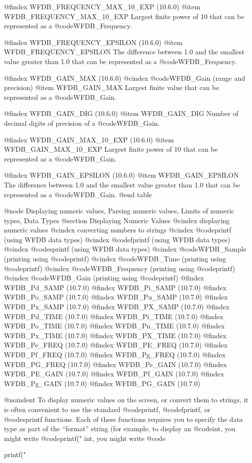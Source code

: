 {{{{{{{{{@findex WFDB_FREQUENCY_MAX_10_EXP (10.6.0)
@item WFDB_FREQUENCY_MAX_10_EXP
Largest finite power of 10 that can be represented as a @code{WFDB_Frequency}.

@findex WFDB_FREQUENCY_EPSILON (10.6.0)
@item WFDB_FREQUENCY_EPSILON
The difference between 1.0 and the smallest value greater than 1.0 that can be
represented as a @code{WFDB_Frequency}.

@findex WFDB_GAIN_MAX (10.6.0)
@cindex @code{WFDB_Gain} (range and precision)
@item WFDB_GAIN_MAX
Largest finite value that can be represented as a @code{WFDB_Gain}.

@findex WFDB_GAIN_DIG (10.6.0)
@item WFDB_GAIN_DIG
Number of decimal digits of precision of a @code{WFDB_Gain}.

@findex WFDB_GAIN_MAX_10_EXP (10.6.0)
@item WFDB_GAIN_MAX_10_EXP
Largest finite power of 10 that can be represented as a @code{WFDB_Gain}.

@findex WFDB_GAIN_EPSILON (10.6.0)
@item WFDB_GAIN_EPSILON
The difference between 1.0 and the smallest value greater than 1.0 that can be
represented as a @code{WFDB_Gain}.
@end table

@node Displaying numeric values, Parsing numeric values, Limits of numeric types, Data Types
@section Displaying Numeric Values
@cindex displaying numeric values
@cindex converting numbers to strings
@cindex @code{printf} (using WFDB data types)
@cindex @code{fprintf} (using WFDB data types)
@cindex @code{sprintf} (using WFDB data types)
@cindex @code{WFDB_Sample} (printing using @code{printf})
@cindex @code{WFDB_Time} (printing using @code{printf})
@cindex @code{WFDB_Frequency} (printing using @code{printf})
@cindex @code{WFDB_Gain} (printing using @code{printf})
@findex WFDB_Pd_SAMP (10.7.0)
@findex WFDB_Pi_SAMP (10.7.0)
@findex WFDB_Po_SAMP (10.7.0)
@findex WFDB_Pu_SAMP (10.7.0)
@findex WFDB_Px_SAMP (10.7.0)
@findex WFDB_PX_SAMP (10.7.0)
@findex WFDB_Pd_TIME (10.7.0)
@findex WFDB_Pi_TIME (10.7.0)
@findex WFDB_Po_TIME (10.7.0)
@findex WFDB_Pu_TIME (10.7.0)
@findex WFDB_Px_TIME (10.7.0)
@findex WFDB_PX_TIME (10.7.0)
@findex WFDB_Pe_FREQ (10.7.0)
@findex WFDB_PE_FREQ (10.7.0)
@findex WFDB_Pf_FREQ (10.7.0)
@findex WFDB_Pg_FREQ (10.7.0)
@findex WFDB_PG_FREQ (10.7.0)
@findex WFDB_Pe_GAIN (10.7.0)
@findex WFDB_PE_GAIN (10.7.0)
@findex WFDB_Pf_GAIN (10.7.0)
@findex WFDB_Pg_GAIN (10.7.0)
@findex WFDB_PG_GAIN (10.7.0)

@noindent
To display numeric values on the screen, or convert them to strings, it is
often convenient to use the standard @code{printf}, @code{fprintf}, or
@code{sprintf} functions.  Each of these functions requires you to specify the
data type as part of the ``format'' string (for example, to display an
@code{int}, you might write @code{printf("%
int}, you might write @code{printf("%

}}}}}}}}}}
